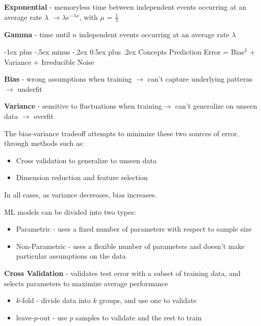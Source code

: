 \documentclass[10pt,landscape]{article}
\makeatletter
\renewcommand{\section}{\@startsection{section}{1}{0mm}%
                                {-1ex plus -.5ex minus -.2ex}%
                                {0.5ex plus .2ex}%
                                {\normalfont\large\bfseries}}
\makeatother
\begin{document}
\begin{multicols}{3}
\textbf{Exponential} - memoryless time between independent events occurring at an average rate $\lambda$ $\to \lambda e^{-\lambda x}$, with $\mu$ = $\frac{1}{\lambda}$

\textbf{Gamma} - time until $n$ independent events occurring at an average rate $\lambda$

\section{Concepts}
Prediction Error = Bias$^2$ + Variance + Irreducible Noise

\textbf{Bias} - wrong assumptions when training $\to$ can't capture underlying patterns $\to$ underfit

\textbf{Variance} - sensitive to fluctuations when training$\to$ can't generalize on unseen data $\to$ overfit

The bias-variance tradeoff attempts to minimize these two sources of error, through methods such as:
\begin{itemize}[label={--},leftmargin=4mm]
\itemsep -.4mm
\vspace{-.5mm}
\item Cross validation to generalize to unseen data
\item Dimension reduction and feature selection
\end{itemize}
\vspace{-.5mm}
In all cases, as variance decreases, bias increases.

\vspace{.5mm}
ML models can be divided into two types:
\vspace{-.5mm}
\begin{itemize}[label={--},leftmargin=4mm]
    \itemsep -.4mm
    \item Parametric - uses a fixed number of parameters with respect to sample size
    \item Non-Parametric - uses a flexible number of parameters and doesn't make particular assumptions on the data
\end{itemize}

\textbf{Cross Validation} - validates test error with a subset of training data, and selects parameters to maximize average performance
\begin{itemize}[label={--},leftmargin=4mm]
\itemsep -.4mm
\vspace{-1mm}
\item $k$-fold - divide data into $k$ groups, and use one to validate
\item leave-$p$-out  - use $p$ samples to validate and the rest to train
\end{itemize}


\end{multicols}
\end{document}
